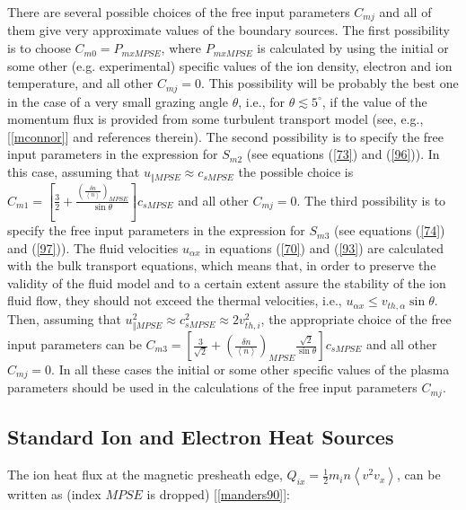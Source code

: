\documentclass[11pt]{article}
\begin{document}
There are several possible choices of the free input parameters $C_{mj}$ and
all of them give very approximate values of the boundary sources. The first
possibility is to choose $C_{m0}=P_{mxMPSE}$, where $P_{mxMPSE}$ is
calculated by using the initial or some other (e.g. experimental) specific
values of the ion density, electron and ion temperature, and all other $%
C_{mj}=0$. This possibility will be probably the best one in the case of a
very small grazing angle $\theta$, i.e., for $\theta\lesssim5^{\circ}$, if
the value of the momentum flux is provided from some turbulent transport
model (see, e.g., [\ref{mconnor}] and references therein). The second
possibility is to specify the free input parameters in the expression for $%
S_{m2}$ (see equations (\ref{73}) and (\ref{96})). In this case, assuming
that $u_{\Vert MPSE}\approx c_{sMPSE}$ the possible choice is $C_{m1}=\left[ 
\frac{3}{2}+\frac{\left( \frac{\delta n}{\left\langle n\right\rangle }%
\right) _{MPSE}}{\sin\theta }\right] c_{sMPSE}$ and all other $C_{mj}=0$.
The third possibility is to specify the free input parameters in the
expression for $S_{m3}$ (see equations (\ref{74}) and (\ref{97})). The fluid
velocities $u_{\alpha x}$ in equations (\ref{70}) and (\ref{93}) are
calculated with the bulk transport equations, which means that, in order to
preserve the validity of the fluid model and to a certain extent assure the
stability of the ion fluid flow, they should not exceed the thermal
velocities, i.e., $u_{\alpha x}\leq v_{th,\alpha}\sin\theta$. Then, assuming
that $u_{\Vert MPSE}^{2}\approx c_{sMPSE}^{2}\approx2v_{th,i}^{2}$, the
appropriate choice of the free input parameters can be $C_{m3}=\left[ \frac{3%
}{\sqrt{2}}+\left( \frac{\delta n}{\left\langle n\right\rangle }\right)
_{MPSE}\frac{\sqrt{2}}{\sin\theta }\right] c_{sMPSE}$ and all other $C_{mj}=0
$. In all these cases the initial or some other specific values of the
plasma parameters should be used in the calculations of the free input
parameters $C_{mj}$.

\bigskip

\subsection{Standard Ion and Electron Heat Sources}

\bigskip

The ion heat flux at the magnetic presheath edge, $Q_{ix}=\frac{1}{2}%
m_{i}n\left\langle v^{2}v_{x}\right\rangle $, can be written as (index $MPSE$
is dropped) [\ref{manders90}]:
\end{document}
